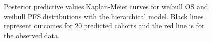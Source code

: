 \documentclass[AMA,STIX1COL]{WileyNJD-v2}
\begin{document}
\begin{figure}[H]
    \centering
    \qquad
    \caption{Posterior predictive values Kaplan-Meier curves for weibull OS and weibull PFS distributions with the hierarchical model. Black lines represent outcomes for 20 predicted cohorts and the red line is for the observed data.}%


\end{figure}
\end{document}
